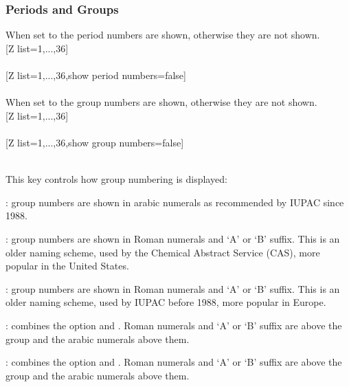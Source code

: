 \subsubsection{\texorpdfstring{ Periods and Groups}{Periods and Groups}}%
\label{option_show period numbers}%
%
{When set to  the period numbers are shown, otherwise they are not shown.}%
\\ [5pt][Z list={1,...,36}]%
\\ [5pt]\makebox[\linewidth][c]{\scalebox{.6}{\pgfPT[Z list={1,...,36}]}}%
\\ [10pt][Z list={1,...,36},show period numbers=false]%
\\ [5pt]\makebox[\linewidth][c]{\scalebox{.6}{\pgfPT[Z list={1,...,36},show period numbers=false]}}%
\\ [5pt]\pgfPTendoption%
\label{option_show group numbers}%
%
{When set to  the group numbers are shown, otherwise they are not shown.}%
\\ [5pt][Z list={1,...,36}]%
\\ [5pt]\makebox[\linewidth][c]{\scalebox{.6}{\pgfPT[Z list={1,...,36}]}}%
\\ [10pt][Z list={1,...,36},show group numbers=false]%
\\ [5pt]\makebox[\linewidth][c]{\scalebox{.6}{\pgfPT[Z list={1,...,36},show group numbers=false]}}%
\\ [0pt]\pgfPTendoption%
\vfill%
\label{option_group numbers}%
%
{This key controls how group numbering is displayed:
\vspace{4pt}\begin{itemlist}
\item{}: group numbers are shown in arabic numerals as recommended by IUPAC since 1988.
\item{}: group numbers are shown in Roman numerals and `A' or `B' suffix. This is an older naming scheme, used by the Chemical Abstract Service (CAS), more popular in the United States.
\item{}: group numbers are shown in Roman numerals and `A' or `B' suffix. This is an older naming scheme, used by IUPAC before 1988, more popular in Europe.
\item{}: combines the option  and . Roman numerals and `A' or `B' suffix are above the group and the arabic numerals above them.
\item{}: combines the option  and . Roman numerals and `A' or `B' suffix are above the group and the arabic numerals above them.
\end{itemlist}
}%
